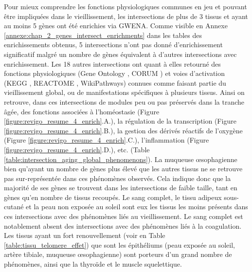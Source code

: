 Pour mieux comprendre les fonctions physiologiques communes en jeu et pouvant être impliquées dans le vieillissement, les intersections de plus de 3 tissus et ayant au moins 5 gènes ont été enrichies via GWENA. Comme visible en Annexe \ref{annexe:chap_2_genes_intersect_enrichments} dans les tables des enrichissements obtenus, 5 intersections n'ont pas donné d'enrichissement significatif malgré un nombre de gènes équivalent à d'autres intersections avec enrichissement. Les 18 autres intersections ont quant à elles retourné des fonctions physiologiques (Gene Ontology , CORUM ) et voies d'activation (KEGG , REACTOME , WikiPathways) connues comme faisant partie du vieillissement global, ou de manifestations spécifiques à plusieurs tissus. Ainsi on retrouve, dans ces intersections de modules peu ou pas préservés dans la tranche âgée, des fonctions associées à l'homéostasie (Figure \ref{figure:revigo_resume_4_enrich}.A.), la régulation de la transcription (Figure \ref{figure:revigo_resume_4_enrich}.B.), la gestion des dérivés réactifs de l'oxygène (Figure \ref{figure:revigo_resume_4_enrich}.C.), l'inflammation (Figure \ref{figure:revigo_resume_4_enrich}.D.), etc. (Table \ref{table:intersection_aging_global_phenomenons}). La muqueuse œsophagienne bien qu'ayant un nombre de gènes plus élevé que les autres tissus ne se retrouve pas sur-représentée dans ces phénomènes observés. Cela indique donc que la majorité de ses gènes se trouvent dans les intersections de faible taille, tant en gènes qu'en nombre de tissus recoupés. Le sang complet, le tissu adipeux sous-cutané et la peau non exposée au soleil sont eux les tissus les moins présents dans ces intersections avec des phénomènes liés au vieillissement. Le sang complet est notablement absent des intersections avec des phénomènes liés à la coagulation. Les tissus ayant un fort renouvellement (voir en Table \ref{table:tissu_telomere_effet}) que sont les épithéliums (peau exposée au soleil, artère tibiale, muqueuse œsophagienne) sont porteurs d'un grand nombre de phénomènes, ainsi que la thyroïde et le muscle squelettique. 



